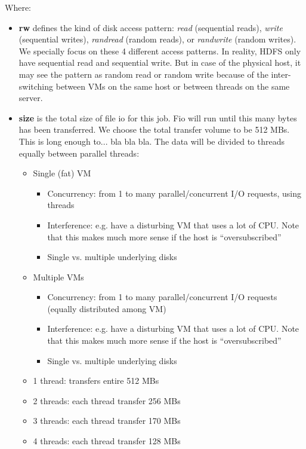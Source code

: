 \documentclass{acmsig}
\begin{document}
Where:
\begin{itemize}
  \item \textbf{rw} defines the kind of disk access pattern: \textit{read} (sequential reads), \textit{write} (sequential writes), \textit{randread} (random reads), or \textit{randwrite} (random writes). We specially focus on these 4 different access patterns. In reality, HDFS only have sequential read and sequential write. But in case of the physical host, it may see the pattern as random read or random write because of the inter-switching between VMs on the same host or between threads on the same server.
  \item \textbf{size} is the total size of file io for this job. Fio will run until this many bytes has been transferred. We choose the total transfer volume to be 512 MBs. This is long enough to... bla bla bla. The data will be divided to threads equally between parallel threads:
  \begin{itemize}

    \item Single (fat) VM
    \begin{itemize}
      \item Concurrency: from 1 to many parallel/concurrent I/O requests, using threads
      \item Interference: e.g. have a disturbing VM that uses a lot of CPU. Note that this makes much more sense if the host is ``oversubscribed''
      \item Single vs. multiple underlying disks
    \end{itemize}
    \item Multiple VMs
    \begin{itemize}
      \item Concurrency: from 1 to many parallel/concurrent I/O requests (equally distributed among VM)
      \item Interference: e.g. have a disturbing VM that uses a lot of CPU. Note that this makes much more sense if the host is ``oversubscribed''
      \item Single vs. multiple underlying disks
    \end{itemize}

    \item 1 thread: transfers entire 512 MBs
    \item 2 threads: each thread transfer 256 MBs
    \item 3 threads: each thread transfer 170 MBs
    \item 4 threads: each thread transfer 128 MBs



\end{itemize}
\end{itemize}
\end{document}

